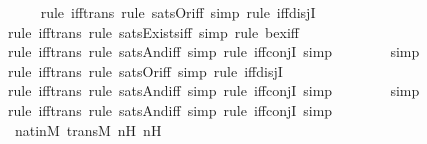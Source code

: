 \begin{isabellebody}
\ \ \ \ \isamarkupfalse%
{\isacharparenleft}{\kern0pt}rule\ iff{\isacharunderscore}{\kern0pt}trans{\isacharcomma}{\kern0pt}\ rule\ sats{\isacharunderscore}{\kern0pt}Or{\isacharunderscore}{\kern0pt}iff{\isacharcomma}{\kern0pt}\ simp{\isacharcomma}{\kern0pt}\ rule\ iff{\isacharunderscore}{\kern0pt}disjI{\isacharparenright}{\kern0pt}\isanewline
\ \ \ \ \ \ \isamarkupfalse%
{\isacharparenleft}{\kern0pt}rule\ iff{\isacharunderscore}{\kern0pt}trans{\isacharcomma}{\kern0pt}\ rule\ sats{\isacharunderscore}{\kern0pt}Exists{\isacharunderscore}{\kern0pt}iff{\isacharcomma}{\kern0pt}\ simp{\isacharcomma}{\kern0pt}\ rule\ bex{\isacharunderscore}{\kern0pt}iff{\isacharparenright}{\kern0pt}\isanewline
\ \ \ \ \ \ \isamarkupfalse%
{\isacharparenleft}{\kern0pt}rule\ iff{\isacharunderscore}{\kern0pt}trans{\isacharcomma}{\kern0pt}\ rule\ sats{\isacharunderscore}{\kern0pt}And{\isacharunderscore}{\kern0pt}iff{\isacharcomma}{\kern0pt}\ simp{\isacharcomma}{\kern0pt}\ rule\ iff{\isacharunderscore}{\kern0pt}conjI{\isacharcomma}{\kern0pt}\ simp{\isacharparenright}{\kern0pt}{\isacharplus}{\kern0pt}\isanewline
\ \ \ \ \ \ \isamarkupfalse%
\ simp\isanewline
\ \ \ \ \ \isamarkupfalse%
{\isacharparenleft}{\kern0pt}rule\ iff{\isacharunderscore}{\kern0pt}trans{\isacharcomma}{\kern0pt}\ rule\ sats{\isacharunderscore}{\kern0pt}Or{\isacharunderscore}{\kern0pt}iff{\isacharcomma}{\kern0pt}\ simp{\isacharcomma}{\kern0pt}\ rule\ iff{\isacharunderscore}{\kern0pt}disjI{\isacharparenright}{\kern0pt}\isanewline
\ \ \ \ \ \ \isamarkupfalse%
{\isacharparenleft}{\kern0pt}rule\ iff{\isacharunderscore}{\kern0pt}trans{\isacharcomma}{\kern0pt}\ rule\ sats{\isacharunderscore}{\kern0pt}And{\isacharunderscore}{\kern0pt}iff{\isacharcomma}{\kern0pt}\ simp{\isacharcomma}{\kern0pt}\ rule\ iff{\isacharunderscore}{\kern0pt}conjI{\isacharcomma}{\kern0pt}\ simp{\isacharparenright}{\kern0pt}{\isacharplus}{\kern0pt}\isanewline
\ \ \ \ \ \ \isamarkupfalse%
\ simp\isanewline
\ \ \ \ \ \isamarkupfalse%
{\isacharparenleft}{\kern0pt}rule\ iff{\isacharunderscore}{\kern0pt}trans{\isacharcomma}{\kern0pt}\ rule\ sats{\isacharunderscore}{\kern0pt}And{\isacharunderscore}{\kern0pt}iff{\isacharcomma}{\kern0pt}\ simp{\isacharcomma}{\kern0pt}\ rule\ iff{\isacharunderscore}{\kern0pt}conjI{\isacharcomma}{\kern0pt}\ simp{\isacharparenright}{\kern0pt}{\isacharplus}{\kern0pt}\isanewline
\ \ \ \ \isamarkupfalse%
\ nat{\isacharunderscore}{\kern0pt}in{\isacharunderscore}{\kern0pt}M\ transM\ nH\ n{\isacharprime}{\kern0pt}H\ \isanewline

\end{isabellebody}

